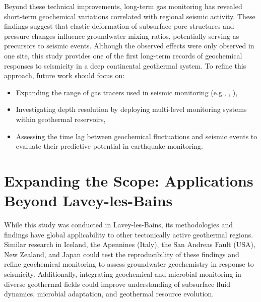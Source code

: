 Beyond these technical improvements, long-term gas monitoring has revealed short-term geochemical variations correlated with regional seismic activity.
These findings suggest that elastic deformation of subsurface pore structures and pressure changes influence groundwater mixing ratios, potentially serving as precursors to seismic events.
Although the observed effects were only observed in one site, this study provides one of the first long-term records of geochemical responses to seismicity in a deep continental geothermal system.
To refine this approach, future work should focus on:

\begin{itemize}
    \item Expanding the range of gas tracers used in seismic monitoring (e.g., , ),
    \item Investigating depth resolution by deploying multi-level monitoring systems within geothermal reservoirs,
    \item Assessing the time lag between geochemical fluctuations and seismic events to evaluate their predictive potential in earthquake monitoring.
\end{itemize}

\section*{Expanding the Scope: Applications Beyond Lavey-les-Bains}
While this study was conducted in Lavey-les-Bains, its methodologies and findings have global applicability to other tectonically active geothermal regions.
Similar research in Iceland, the Apennines (Italy), the San Andreas Fault (USA), New Zealand, and Japan could test the reproducibility of these findings and refine geochemical monitoring to assess groundwater geochemistry in response to seismicity.
Additionally, integrating geochemical and microbial monitoring in diverse geothermal fields could improve understanding of subsurface fluid dynamics, microbial adaptation, and geothermal resource evolution.

